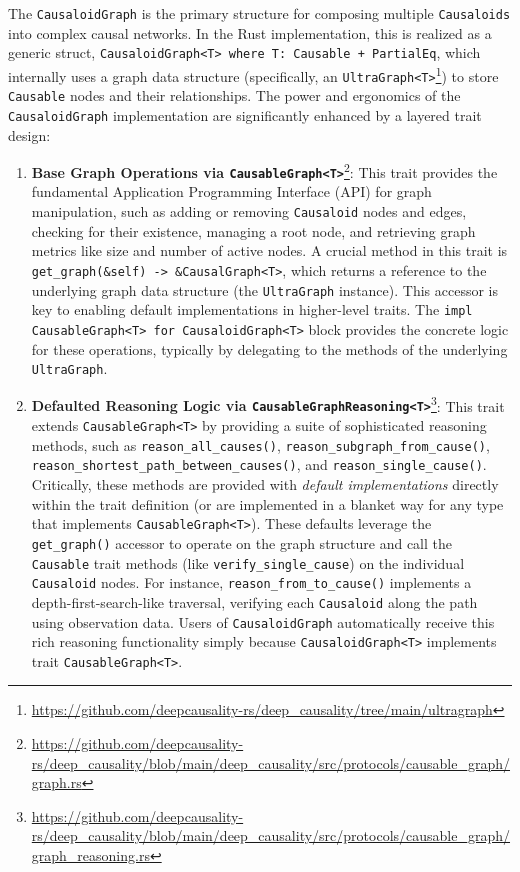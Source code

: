 The \texttt{CausaloidGraph} is the primary structure for composing multiple \texttt{Causaloids} into complex causal networks. In the Rust implementation, this is realized as a generic struct, \texttt{CausaloidGraph<T> where T: Causable + PartialEq}, which internally uses a graph data structure (specifically, an \texttt{UltraGraph<T>}\footnote{\url{https://github.com/deepcausality-rs/deep_causality/tree/main/ultragraph}}) to store \texttt{Causable} nodes and their relationships. The power and ergonomics of the \texttt{CausaloidGraph} implementation are significantly enhanced by a layered trait design:
\begin{enumerate}
    \item \textbf{Base Graph Operations via \texttt{CausableGraph<T>}}\footnote{\url{https://github.com/deepcausality-rs/deep_causality/blob/main/deep_causality/src/protocols/causable_graph/graph.rs}}: This trait provides the fundamental Application Programming Interface (API) for graph manipulation, such as adding or removing \texttt{Causaloid} nodes and edges, checking for their existence, managing a root node, and retrieving graph metrics like size and number of active nodes. A crucial method in this trait is \texttt{get\_graph(\&self) -> \&CausalGraph<T>}, which returns a reference to the underlying graph data structure (the \texttt{UltraGraph} instance). This accessor is key to enabling default implementations in higher-level traits. The \texttt{impl CausableGraph<T> for CausaloidGraph<T>} block provides the concrete logic for these operations, typically by delegating to the methods of the underlying \texttt{UltraGraph}.

    \item \textbf{Defaulted Reasoning Logic via \texttt{CausableGraphReasoning<T>}}\footnote{\url{https://github.com/deepcausality-rs/deep_causality/blob/main/deep_causality/src/protocols/causable_graph/graph_reasoning.rs}}: This trait extends \texttt{CausableGraph<T>} by providing a suite of sophisticated reasoning methods, such as \texttt{reason\_all\_causes()}, \texttt{reason\_subgraph\_from\_cause()}, \texttt{reason\_shortest\_path\_between\_causes()}, and \texttt{reason\_single\_cause()}. Critically, these methods are provided with \textit{default implementations} directly within the trait definition (or are implemented in a blanket way for any type that implements \texttt{CausableGraph<T>}). These defaults leverage the \texttt{get\_graph()} accessor to operate on the graph structure and call the \texttt{Causable} trait methods (like \texttt{verify\_single\_cause}) on the individual \texttt{Causaloid} nodes. For instance, \texttt{reason\_from\_to\_cause()} implements a depth-first-search-like traversal, verifying each \texttt{Causaloid} along the path using observation data. Users of \texttt{CausaloidGraph} automatically receive this rich reasoning functionality simply because \texttt{CausaloidGraph<T>} implements trait \texttt{CausableGraph<T>}.


\end{enumerate}

